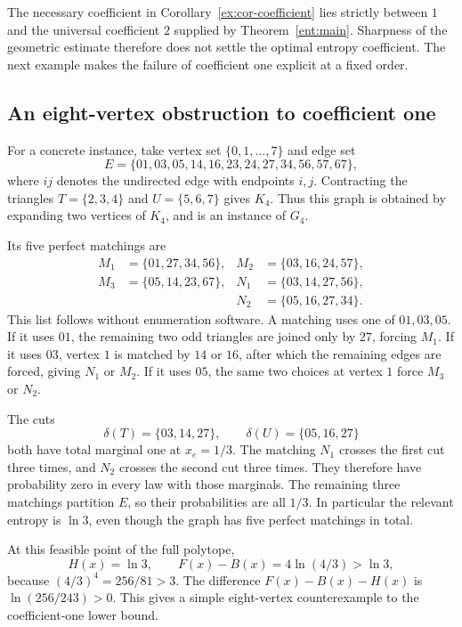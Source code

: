 The necessary coefficient in Corollary~\ref{ex:cor-coefficient} lies
strictly between $1$ and the universal coefficient $2$ supplied by
Theorem~\ref{ent:main}. Sharpness of the geometric estimate therefore
does not settle the optimal entropy coefficient. The next example makes
the failure of coefficient one explicit at a fixed order.

\subsection{An eight-vertex obstruction to coefficient one}

For a concrete instance, take vertex set \(\{0,1,\ldots,7\}\) and
edge set
\[
 E=\{01,03,05,14,16,23,24,27,34,56,57,67\},
\]
where \(ij\) denotes the undirected edge with endpoints \(i,j\).
Contracting the triangles \(T=\{2,3,4\}\) and
\(U=\{5,6,7\}\) gives \(K_4\). Thus this graph is obtained by
expanding two vertices of \(K_4\), and is an instance of \(G_4\).

Its five perfect matchings are
\[
 \begin{aligned}
 M_1&=\{01,27,34,56\},&
 M_2&=\{03,16,24,57\},\\
 M_3&=\{05,14,23,67\},&
 N_1&=\{03,14,27,56\},\\
 &&N_2&=\{05,16,27,34\}.
 \end{aligned}
\]
This list follows without enumeration software. A matching uses
one of \(01,03,05\). If it uses \(01\), the remaining two odd
triangles are joined only by \(27\), forcing \(M_1\). If it uses
\(03\), vertex \(1\) is matched by \(14\) or \(16\), after which
the remaining edges are forced, giving \(N_1\) or \(M_2\).
If it uses \(05\), the same two choices at vertex \(1\) force
\(M_3\) or \(N_2\).

The cuts
\[
 \delta(T)=\{03,14,27\},\qquad
 \delta(U)=\{05,16,27\}
\]
both have total marginal one at \(x_e=1/3\).
The matching \(N_1\) crosses the first cut three times, and
\(N_2\) crosses the second cut three times. They therefore have
probability zero in every law with those marginals. The remaining
three matchings partition \(E\), so their probabilities are all
\(1/3\). In particular the relevant entropy is \(\ln3\), even
though the graph has five perfect matchings in total.

At this feasible point of the full polytope,
\[
 H(x)=\ln3,\qquad
 F(x)-B(x)=4\ln(4/3)>\ln3,
\]
because \( (4/3)^4=256/81>3\).
The difference \(F(x)-B(x)-H(x)\) is
\(\ln(256/243)>0\). This gives a simple eight-vertex
counterexample to the coefficient-one lower bound.
